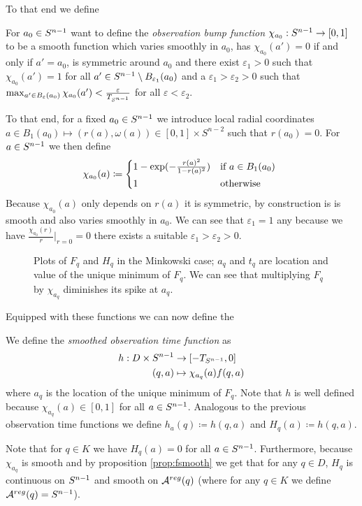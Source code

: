 To that end we define 
\begin{definition}\label{def:obsbumpfn}
    For $a_0\in {S^{n-1}}$ want to define the \emph{observation bump function} $\chi_{a_0}:{S^{n-1}}\to [0,1]$ to be a smooth function which varies smoothly in $a_0$, has $\chi_{a_0}(a')=0$ if and only if $a'=a_0$, is symmetric around $a_0$ and there exist $\varepsilon_1>0$ such that $\chi_{a_0}(a')=1$ for all $a'\in {S^{n-1}}\setminus B_{\varepsilon_1}(a_0)$ and a $\varepsilon_1 > \varepsilon_2 > 0$ such that $\max_{a'\in B_{\varepsilon}(a_0)} \chi_{a_0}(a')<\frac{\varepsilon}{T_{S^{n-1}}}$ for all $\varepsilon<\varepsilon_2$.

    To that end, for a fixed $a_0\in {S^{n-1}}$ we introduce local radial coordinates $a\in B_1(a_0)\mapsto (r(a),\omega(a))\in [0,1]\times S^{n-2}$ such that $r(a_0)=0$. For $a \in {S^{n-1}}$ we then define 
    \begin{equation*}
        \chi_{a_0}(a) \coloneqq  
        \begin{cases*}
            1-\exp(-\frac{r(a)^2}{1-r(a)^2}) & if $a\in B_1(a_0)$ \\
            1 & otherwise
        \end{cases*}
    \end{equation*}
    Because $\chi_{a_0}(a)$ only depends on $r(a)$ it is symmetric, by construction is is smooth and also varies smoothly in $a_0$. We can see that $\varepsilon_1 = 1$ any because we have $\frac{\chi_{a_0}(r)}{r}\rvert_{r=0}=0$ there exists a suitable $\varepsilon_1 > \varepsilon_2 > 0$.
\end{definition}

\begin{figure}\label{fig:SmoothedObsTime}
    \centering
    
    \caption{
        Plots of $F_q$ and $H_q$ in the Minkowski case; $a_q$ and $t_q$ are location and value of the unique minimum of $F_q$. We can see that multiplying $F_q$ by $\chi_{a_q}$ diminishes its spike at $a_q$.
    }
\end{figure}

Equipped with these functions we can now define the
\begin{definition}
    We define the \emph{smoothed observation time function} as 
    \begin{align*}
        h:D\times {S^{n-1}} &\to [-T_{S^{n-1}},0] \\
        (q,a)&\mapsto \chi_{a_q}(a)f(q,a)
    \end{align*}
    where $a_q$ is the location of the unique minimum of $F_q$. Note that $h$ is well defined because $\chi_{a_q}(a)\in [0,1]$ for all $a\in {S^{n-1}}$. 
    Analogous to the previous observation time functions we define $h_a(q)\coloneqq h(q,a)$ and $H_q(a)\coloneqq h(q,a)$.
\end{definition}
\begin{remark}
    Note that for $q\in K$ we have $H_q(a)=0$ for all $a\in {S^{n-1}}$. Furthermore, because $\chi_{a_q}$ is smooth and by proposition \ref{prop:fsmooth} we get that for any $q\in D$, $H_q$ is continuous on ${S^{n-1}}$ and smooth on ${{\mathcal{A}}^{reg}}(q)$ (where for any $q\in K$ we define ${{\mathcal{A}}^{reg}}(q)={S^{n-1}}$).
\end{remark}

